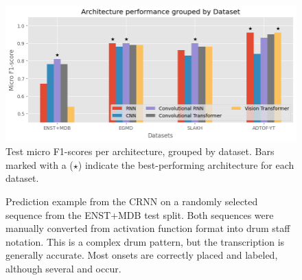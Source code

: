 \begin{figure}[H]
    \centering
    \hspace*{-0.8cm}
    \includegraphics[scale=0.8]{figures/architectureperformancedataset.png}
    \caption{Test micro F1-scores per architecture, grouped by dataset. Bars marked with a ($\star$) indicate the best-performing architecture for each dataset.}
    \label{ArchitectureResultsDatasetFigure}
\end{figure}

\begin{figure}[H]
    \centering
    \caption{Prediction example from the \acrfull{CRNN} on a randomly selected sequence from the ENST+MDB test split. Both sequences were manually converted from activation function format into drum staff notation. This is a complex drum pattern, but the transcription is generally accurate. Most onsets are correctly placed and labeled, although several  and  occur.}
    \label{ArchitecturePredictionComparisonENST+MDBFigure}
\end{figure}

